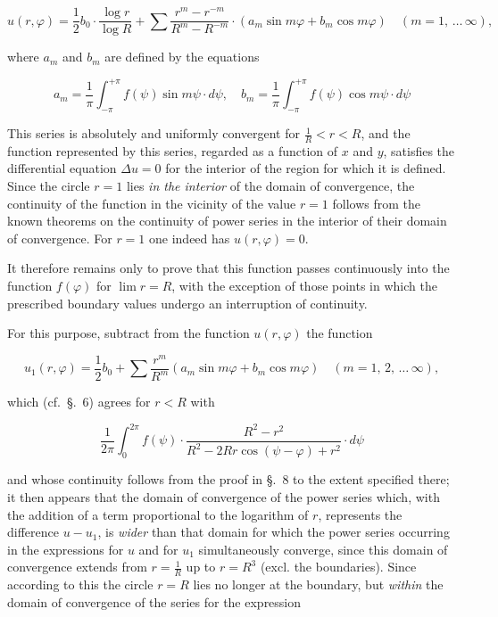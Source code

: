 \documentclass{article}
\begin{document}

\[

u(r, \varphi) = \frac{1}{2} b_0 \cdot \frac{\log r}{\log R} + \sum \frac{r^m - r^{-m}}{R^m - R^{-m}} \cdot (a_m \sin m\varphi + b_m \cos m\varphi) \quad (m = 1, \, \dots \, \infty),

\]

where $a_m$ and $b_m$ are defined by the equations

\[

a_m = \frac{1}{\pi} \int_{-\pi}^{+\pi} f(\psi) \sin m\psi \cdot d\psi, \quad b_m = \frac{1}{\pi} \int_{-\pi}^{+\pi} f(\psi) \cos m\psi \cdot d\psi

\]



This series is absolutely and uniformly convergent for $\frac{1}{R} < r < R$, and the function represented by this series, regarded as a function of $x$ and $y$, satisfies the differential equation $\Delta u = 0$ for the interior of the region for which it is defined. Since the circle $r = 1$ lies \emph{in the interior} of the domain of convergence, the continuity of the function in the vicinity of the value $r = 1$ follows from the known theorems on the continuity of power series in the interior of their domain of convergence. For $r = 1$ one indeed has $u(r, \varphi) = 0$.



It therefore remains only to prove that this function passes continuously into the function $f(\varphi)$ for $\lim r = R$, with the exception of those points in which the prescribed boundary values undergo an interruption of continuity.



For this purpose, subtract from the function $u(r, \varphi)$ the function

\[

u_1(r, \varphi) = \frac{1}{2} b_0 + \sum \frac{r^m}{R^m} (a_m \sin m\varphi + b_m \cos m\varphi) \quad (m = 1, \, 2, \, \dots \, \infty),

\]

which (cf.~§.~6) agrees for $r < R$ with

\[

\frac{1}{2\pi} \int_0^{2\pi} f(\psi) \cdot \frac{R^2 - r^2}{R^2 - 2Rr \cos(\psi - \varphi) + r^2} \cdot d\psi

\]

and whose continuity follows from the proof in §.~8 to the extent specified there; it then appears that the domain of convergence of the power series which, with the addition of a term proportional to the logarithm of $r$, represents the difference $u - u_1$, is \emph{wider} than that domain for which the power series occurring in the expressions for $u$ and for $u_1$ simultaneously converge, since this domain of convergence extends from $r = \frac{1}{R}$ up to $r = R^3$ (excl. the boundaries). Since according to this the circle $r = R$ lies no longer at the boundary, but \emph{within} the domain of convergence of the series for the expression
\end{document}
